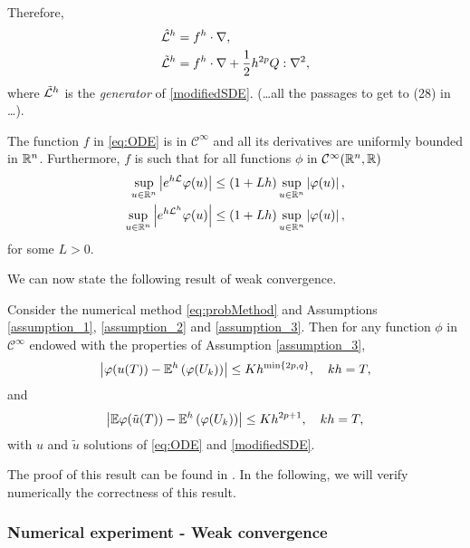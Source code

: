 Therefore,
\begin{equation}
\begin{aligned}
	\hat {\mathcal{L}}^h &= f^h \cdot \nabla, \\
	\tilde {\mathcal{L}}^h &= f^h \cdot \nabla + \frac{1}{2} h^{2p} Q : \nabla^2,
\end{aligned}
\end{equation}
where $\tilde {\mathcal{L}}^h$ is the \textit{generator} of \eqref{modifiedSDE}. (\ldots all the passages to get to (28) in \cite{CGS16} \ldots).
\begin{assumption} \label{assumption_3}The function $f$ in \eqref{eq:ODE} is in $\mathcal C^\infty$ and all its derivatives are uniformly bounded in $\mathbb{R}^n$. Furthermore, $f$ is such that for all functions $\phi$ in $\mathcal C ^\infty(\mathbb{R}^n, \mathbb{R})$ 
\begin{equation}
\begin{aligned}
	\sup_{u\in\mathbb{R}^n} \left| e^{h\mathcal{L}} \varphi(u) \right| &\leq (1 + Lh) \sup_{u\in\mathbb{R}^n} \left|\varphi(u)\right|, \\
	\sup_{u\in\mathbb{R}^n} \left| e^{h\mathcal{L}^h} \varphi(u) \right| &\leq (1 + Lh) \sup_{u\in\mathbb{R}^n} \left|\varphi(u)\right|, \\
\end{aligned}
\end{equation}
for some $L > 0$.
\end{assumption}
\noindent We can now state the following result of weak convergence.
\begin{theorem}\label{thm:weakorder} Consider the numerical method \eqref{eq:probMethod} and Assumptions \ref{assumption_1}, \ref{assumption_2} and \ref{assumption_3}. Then for any function $\phi$ in $\mathcal{C}^\infty$ endowed with the properties of Assumption \ref{assumption_3},
\begin{equation}
	\left|\varphi(u(T)) - \mathbb{E}^h\left(\varphi(U_k)\right)\right| \leq Kh^{\min\{2p, q\}}, \quad kh = T,
\end{equation}
and 
\begin{equation}
\left|\mathbb{E}\varphi(\tilde u(T)) - \mathbb{E}^h\left(\varphi(U_k)\right)\right| \leq Kh^{2p + 1}, \quad kh = T,
\end{equation}
with $u$ and $\tilde u$ solutions of \eqref{eq:ODE} and \eqref{modifiedSDE}.
\end{theorem}
\noindent The proof of this result can be found in \cite{CGS16}. In the following, we will verify numerically the correctness of this result.

\subsubsection{Numerical experiment - Weak convergence}

